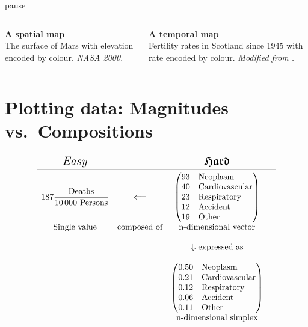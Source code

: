 \documentclass{beamer}
\begin{document}
\begin{frame}{pause}
\begin{columns}[c]
\footnotesize\textbf{A spatial map}\\ The surface of Mars with elevation encoded by colour. \scriptsize\emph{NASA 2000}.

\vspace{2.5cm}

\footnotesize\textbf{A temporal map}\\ Fertility rates in Scotland since 1945 with rate encoded by colour. \scriptsize\emph{Modified from \cite{Riffe2011}.}

\end{columns}

\end{frame}

\section{Plotting data: Magnitudes vs.~Compositions} %

\begin{frame}
\frametitle{\insertsection}

$$
\begin{matrix*}[c]
\mbox{\Large$\mathit{Easy}$} & & \mbox{\Large$\mathfrak{Hard}$} \\\midrule
187 \dfrac {\text{Deaths}} {10\,000~\text{Persons}} &
\Longleftarrow &
\begin{pmatrix*}[l]
93 & \text{Neoplasm} \\
40 & \text{Cardiovascular} \\
23 & \text{Respiratory} \\
12 & \text{Accident} \\
19 & \text{Other}
\end{pmatrix*} \\
\text{Single~value} & \text{composed~of} & \text{n-dimensional~vector} \\
& & & \\
& & \Downarrow \text{expressed~as} \\
& & & \\
& & \begin{pmatrix*}[l]
0.50 & \text{Neoplasm} \\
0.21 & \text{Cardiovascular} \\
0.12 & \text{Respiratory} \\
0.06 & \text{Accident} \\
0.11 & \text{Other}
\end{pmatrix*} \\
& & \text{n-dimensional simplex}
\end{matrix*}
$$

\end{frame}
\end{document}
